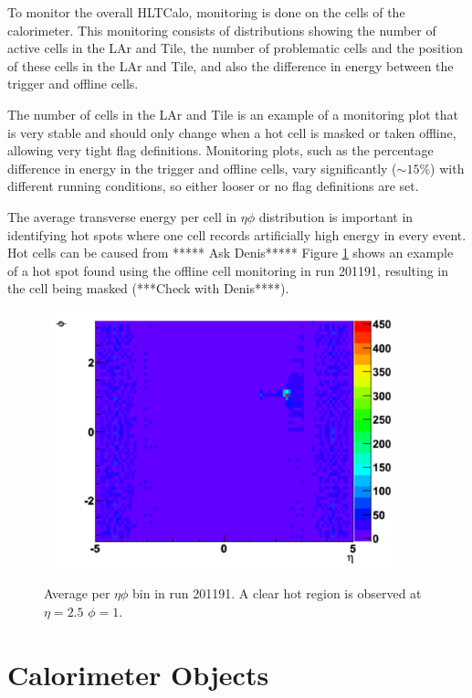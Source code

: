 To monitor the overall HLTCalo, monitoring is done on the cells of the calorimeter.
This monitoring consists of distributions showing the number of active cells in the LAr and Tile, the number of problematic cells and the position of these cells in the LAr and Tile, and also the difference in energy between the trigger and offline cells.

The number of cells in the LAr and Tile is an example of a monitoring plot that is very stable and  should only change when a hot cell is masked or taken offline, allowing very tight flag definitions.
Monitoring plots, such as the percentage difference in energy in the trigger and offline cells, vary significantly ($\sim15\%$) with different running conditions, so either looser or no flag definitions are set.

The average transverse energy per cell in $\eta  \phi$ distribution is important in identifying hot spots where one cell records artificially high energy in every event.
Hot cells can be caused from ***** Ask Denis***** 
Figure \ref{SW_hotspot} shows an example of a hot spot found using the offline cell monitoring in run 201191, resulting in the cell being masked (***Check with Denis****).

\begin{figure}
\centering
\mbox{
   \includegraphics[width=0.9\textwidth]{figures/ServiceWork/Cells_HotSpot.pdf}
}
\caption[Offline egamma \et{} verses L2/EF egamma \et{}]{Average \et{} per $\eta \phi$ bin in run 201191. A clear hot region is observed at $\eta=2.5$ $\phi=1$. \label{SW_hotspot}}
\end{figure}



\section{Calorimeter Objects}

